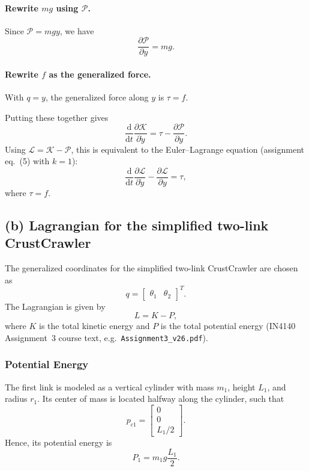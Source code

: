 \documentclass{article}
\begin{document}
\paragraph{Rewrite $mg$ using $\mathcal{P}$.}
Since $\mathcal{P} = mgy$, we have
\begin{equation}
    \frac{\partial \mathcal{P}}{\partial y} = mg.
\end{equation}

\paragraph{Rewrite $f$ as the generalized force.}
With $q=y$, the generalized force along $y$ is $\tau = f$.

Putting these together gives
\begin{equation}
    \frac{\mathrm{d}}{\mathrm{d}t}\frac{\partial \mathcal{K}}{\partial \dot y}
    =
    \tau - \frac{\partial \mathcal{P}}{\partial y}.
\end{equation}
Using $\mathcal{L}=\mathcal{K}-\mathcal{P}$, this is equivalent to the Euler--Lagrange equation (assignment eq.~(5) with $k=1$):
\begin{equation}
    \frac{\mathrm{d}}{\mathrm{d}t}\frac{\partial \mathcal{L}}{\partial \dot y} - \frac{\partial \mathcal{L}}{\partial y} = \tau,
\end{equation}
where $\tau=f$.

\subsection*{(b) Lagrangian for the simplified two-link CrustCrawler}

The generalized coordinates for the simplified two-link CrustCrawler are chosen as
\[
q = \begin{bmatrix}\theta_1 & \theta_2\end{bmatrix}^T.
\]
The Lagrangian is given by
\[
L = K - P,
\]
where \(K\) is the total kinetic energy and \(P\) is the total potential energy (IN4140 Assignment~3 course text, e.g.\ \texttt{Assignment3\_v26.pdf}).

\subsubsection*{Potential Energy}

The first link is modeled as a vertical cylinder with mass \(m_1\), height \(L_1\), and radius \(r_1\). Its center of mass is located halfway along the cylinder, such that
\[
p_{c1} = \begin{bmatrix}0 \\ 0 \\ L_1/2\end{bmatrix}.
\]
Hence, its potential energy is
\[
P_1 = m_1 g \frac{L_1}{2}.
\]
\end{document}
